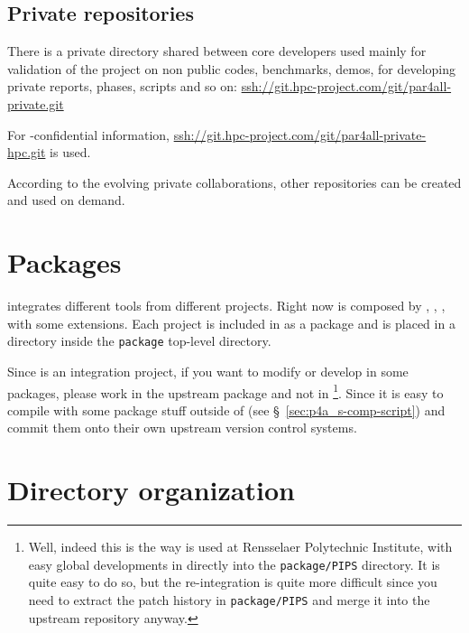 \documentclass[a4paper]{article}
\begin{document}
\subsection{Private repositories}
\label{sec:private-repositories}

There is a private directory shared between core developers used mainly
for validation of the project on non public codes, benchmarks, demos, for
developing private reports, phases, scripts and so on:
\url{ssh://git.hpc-project.com/git/par4all-private.git}

For \Ahpcp-confidential information,
\url{ssh://git.hpc-project.com/git/par4all-private-hpc.git} is used.

According to the evolving private collaborations, other repositories can
be created and used on demand.


\section{Packages}
\label{sec:packages}

\Apfa integrates different tools from different projects. Right now \Apfa
is composed by \Apips, \Apipsgfc, \Apolylib, with some extensions. Each
project is included in \Apfa as a package and is placed in a directory
inside the \texttt{package} top-level directory.

Since \Apfa is an integration project, if you want to modify or develop in
some packages, please work in the upstream package and not in
\Apfa\footnote{Well, indeed this is the way \Apfa is used at Rensselaer
  Polytechnic Institute, with easy global developments in \Apips directly
  into the \texttt{package/PIPS} directory. It is quite easy to do so, but
  the re-integration is quite more difficult since you need to extract the
  patch history in \texttt{package/PIPS} and merge it into the \Apips
  upstream \Asvn repository anyway.}. Since it is easy to compile \Apfa
with some package stuff outside of \Apfa (see
\S~\ref{sec:p4a_s-comp-script}) and commit them onto their own upstream
version control systems.


\section{Directory organization}
\label{sec:direct-organ}
\end{document}
